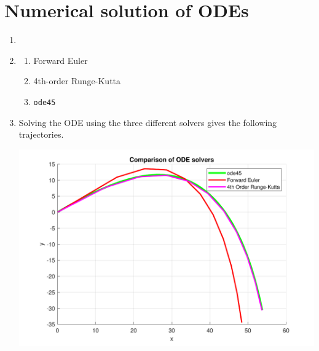 \documentclass[a4paper,11pt]{article}
\begin{document}
\section{Numerical solution of ODEs}
\begin{enumerate}
	\item 
	
	
	\item\begin{enumerate}
		\item Forward Euler
		
		\item 4th-order Runge-Kutta
		
		\item \verb*|ode45|
		
	\end{enumerate}


	\item Solving the ODE using the three different solvers gives the 
	following trajectories.
	\begin{center}
		\includegraphics[scale=0.7]{images/Q3c.pdf}
	\end{center}


\end{enumerate}
\end{document}
